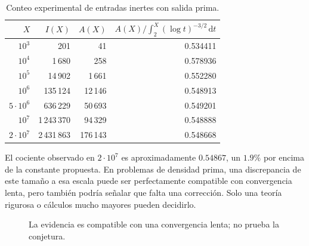 \documentclass[11pt,a4paper,openany]{report}
\newcommand{\dd}{\,\mathrm{d}}
\begin{document}
\begin{table}[H]
\centering
\caption{Conteo experimental de entradas inertes con salida prima.}
\begin{tabular}{rrrr}
\toprule
\(X\)&\(I(X)\)&\(A(X)\)&\(A(X)/\int_2^X(\log t)^{-3/2}\dd t\)\\
\midrule
\(10^3\)&201&41&0.534411\\
\(10^4\)&1\,680&258&0.578936\\
\(10^5\)&14\,902&1\,661&0.552280\\
\(10^6\)&135\,124&12\,146&0.548913\\
\(5\cdot10^6\)&636\,229&50\,693&0.549201\\
\(10^7\)&1\,243\,370&94\,329&0.548888\\
\(2\cdot10^7\)&2\,431\,863&176\,143&0.548668\\
\bottomrule
\end{tabular}
\label{tab:transmutation-data}
\end{table}

\begin{experimentalbox}
El cociente observado en \(2\cdot10^7\) es aproximadamente \(0.54867\), un \(1.9\%\) por encima de la constante propuesta. En problemas de densidad prima, una discrepancia de este tamaño a esa escala puede ser perfectamente compatible con convergencia lenta, pero también podría señalar que falta una corrección. Solo una teoría rigurosa o cálculos mucho mayores pueden decidirlo.
\end{experimentalbox}

\begin{figure}[H]
\centering
{}
\caption{La evidencia es compatible con una convergencia lenta; no prueba la conjetura.}
\label{fig:Tpar-data}
\end{figure}
\end{document}
